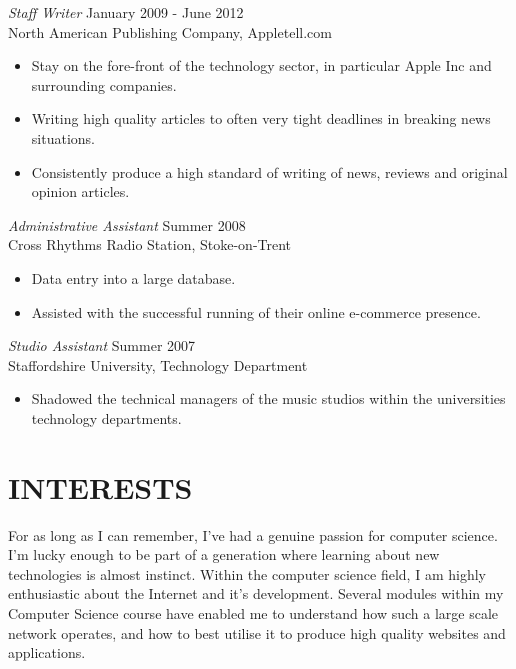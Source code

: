 \documentclass[line,margin]{res}
\begin{document}
\begin{resume}
	       {\sl Staff Writer} \hfill January 2009 - June 2012 \\
                North American Publishing Company, Appletell.com
                 \begin{itemize}  \itemsep -2pt %
                 \item Stay on the fore-front of the technology sector, in particular Apple Inc and surrounding companies.
	       \item Writing high quality articles to often very tight deadlines in breaking news situations.
	       \item Consistently produce a high standard of writing of news, reviews and original opinion articles.
                \end{itemize}
 
              {\sl Administrative Assistant} \hfill            Summer 2008 \\
                Cross Rhythms Radio Station, Stoke-on-Trent
                 \begin{itemize}  \itemsep -2pt %
                 \item Data entry into a large database.
	        \item Assisted with the successful running of their online e-commerce presence.
                 \end{itemize} 

	{\sl Studio Assistant} \hfill Summer 2007 \\
	Staffordshire University, Technology Department
	\begin{itemize} \itemsep -2pt
	\item Shadowed the technical managers of the music studios within the universities technology departments.
	\end{itemize}
        

\section{INTERESTS}             
           For as long as I can remember, I've had a genuine passion for computer science. I'm lucky
enough to be part of a generation where learning about new technologies is almost
instinct. Within the computer science field, I am highly enthusiastic about the Internet
and it's development. Several modules within my Computer Science course have enabled me to
understand how such a large scale network operates, and how to best utilise it to produce
high quality websites and applications.


\end{resume}
\end{document}

